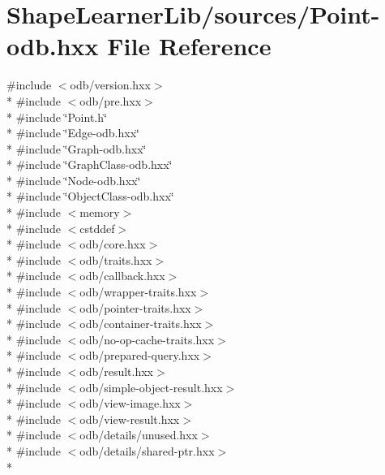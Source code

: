 \hypertarget{_point-odb_8hxx}{}\section{Shape\+Learner\+Lib/sources/\+Point-\/odb.hxx File Reference}
\label{_point-odb_8hxx}
{\ttfamily \#include $<$odb/version.\+hxx$>$}\\*
{\ttfamily \#include $<$odb/pre.\+hxx$>$}\\*
{\ttfamily \#include \char`\"{}Point.\+h\char`\"{}}\\*
{\ttfamily \#include \char`\"{}Edge-\/odb.\+hxx\char`\"{}}\\*
{\ttfamily \#include \char`\"{}Graph-\/odb.\+hxx\char`\"{}}\\*
{\ttfamily \#include \char`\"{}Graph\+Class-\/odb.\+hxx\char`\"{}}\\*
{\ttfamily \#include \char`\"{}Node-\/odb.\+hxx\char`\"{}}\\*
{\ttfamily \#include \char`\"{}Object\+Class-\/odb.\+hxx\char`\"{}}\\*
{\ttfamily \#include $<$memory$>$}\\*
{\ttfamily \#include $<$cstddef$>$}\\*
{\ttfamily \#include $<$odb/core.\+hxx$>$}\\*
{\ttfamily \#include $<$odb/traits.\+hxx$>$}\\*
{\ttfamily \#include $<$odb/callback.\+hxx$>$}\\*
{\ttfamily \#include $<$odb/wrapper-\/traits.\+hxx$>$}\\*
{\ttfamily \#include $<$odb/pointer-\/traits.\+hxx$>$}\\*
{\ttfamily \#include $<$odb/container-\/traits.\+hxx$>$}\\*
{\ttfamily \#include $<$odb/no-\/op-\/cache-\/traits.\+hxx$>$}\\*
{\ttfamily \#include $<$odb/prepared-\/query.\+hxx$>$}\\*
{\ttfamily \#include $<$odb/result.\+hxx$>$}\\*
{\ttfamily \#include $<$odb/simple-\/object-\/result.\+hxx$>$}\\*
{\ttfamily \#include $<$odb/view-\/image.\+hxx$>$}\\*
{\ttfamily \#include $<$odb/view-\/result.\+hxx$>$}\\*
{\ttfamily \#include $<$odb/details/unused.\+hxx$>$}\\*
{\ttfamily \#include $<$odb/details/shared-\/ptr.\+hxx$>$}\\*
